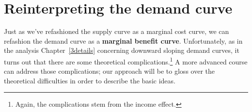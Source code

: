 \begin{comment}
If the market price is \$3.50 per unit and the firm produces three units, its total revenue will be $\$3.50 \cdot 3 = \$10.50$, and its total variable cost of production will be \$6. The difference between total revenue and total variable costs (in this case, \$4.50) is \textbf{producer surplus}: this is the benefit that the seller gets from selling. Note that producer surplus is not the same thing as profit because we haven't accounted for fixed costs\index{cost!fixed}. Once we account for fixed costs\index{cost!fixed}, the profit that is left over should be comparable to profits from comparable investments. (See Chapter~\ref{1transition}.)


\begin{figure}[t]
\begin{center}
\begin{pspicture}(0,0)(8,8)
\rput(-6,0){
    \psline(0,8)(8,0)
    \psline(0,0)(8,8)
    \pspolygon[fillstyle=hlines, fillcolor=black, linecolor=black](0,0)(4,0)(4,4)
    \rput*(2.7,1){TVC}
    \pspolygon[fillstyle=vlines, fillcolor=black, linecolor=black](0,0)(0,4)(4,4)
    \rput*(1.2,2.9){PS}
    \rput[r](-.2,7.5){$P$}
    \rput[t](7.5,-.2){$Q$}
    \psaxes[labels=none, ticks=none, showorigin=false](8,8)
    }
\rput(6,0){
    \psline(0,8)(8,0)
    \psline(0,0)(8,8)
    \pspolygon[fillstyle=vlines, fillcolor=black, linecolor=black](0,0)(4,0)(4,4)(0,4)
    \rput*(2,2){TR}
    \rput[r](-.2,7.5){$P$}
    \rput[t](7.5,-.2){$Q$}
    \psaxes[labels=none, ticks=none, showorigin=false](8,8)
    }
\end{pspicture}
\end{center}
\caption{Producer surplus = total revenue $-$ total variable cost}
\label{fig:producer_surplus} %
\end{figure}
\end{comment}




\section{Reinterpreting the demand curve}


Just as we've refashioned the supply curve as a marginal cost curve, we can refashion the demand curve as a \textbf{marginal benefit curve}. Unfortunately, as in the analysis Chapter~\ref{3details} concerning downward sloping demand curves, it turns out that there are some theoretical complications.\footnote{Again, the complications stem from the income effect.} A more advanced course can address those complications; our approach will be to gloss over the theoretical difficulties in order to describe the basic ideas.

